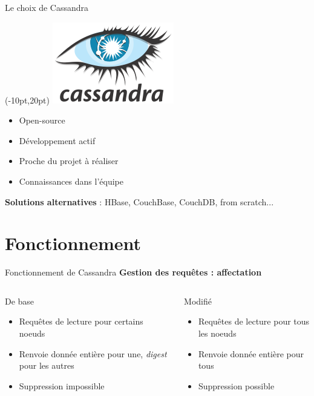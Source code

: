 \documentclass{beamer}
\newcommand{\success}{\color{SuccessGreen}\CheckmarkBold}
\begin{document}
\begin{frame}{Le choix de Cassandra}
\begin{textblock*}{\paperwidth}(-10pt,20pt)
    \raggedleft \includegraphics[scale=0.2]{cassandra_logo}
\end{textblock*}
\begin{itemize}
	\item Open-source
	\item Développement actif
	\item Proche du projet à réaliser
	\item Connaissances dans l'équipe
\end{itemize}
\textbf{Solutions alternatives} : HBase, CouchBase, CouchDB, from scratch...
\end{frame}

\section{Fonctionnement}

\begin{frame}{Fonctionnement de Cassandra}
\textbf{Gestion des requêtes : affectation}
\begin{columns}
\begin{column}[c]{5cm}
\begin{block}{De base}
\begin{itemize}
	\item Requêtes de lecture pour certains noeuds
	\item Renvoie donnée entière pour une, \textit{digest} pour les autres
	\item Suppression impossible
\end{itemize}
\end{block}
\end{column}

\begin{column}[c]{5cm}
\begin{block}{Modifié}
\begin{itemize}
	\item[\success] Requêtes de lecture pour tous les noeuds
	\item[\success] Renvoie donnée entière pour tous
	\item[\success] Suppression possible
\end{itemize}
\end{block}
\end{column}
\end{columns}
\end{frame}
\end{document}

